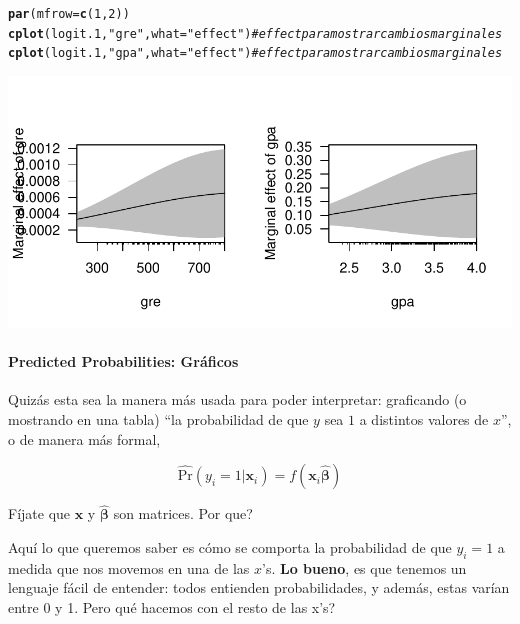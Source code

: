 \documentclass[onesided]{article}\usepackage[]{graphicx}\usepackage[]{color}
\makeatletter
\def\maxwidth{ %
  \ifdim\Gin@nat@width>\linewidth
    \linewidth
  \else
    \Gin@nat@width
  \fi
}
\newcommand{\hlnum}[1]{\textcolor[rgb]{0.686,0.059,0.569}{#1}}%
\newcommand{\hlstr}[1]{\textcolor[rgb]{0.192,0.494,0.8}{#1}}%
\newcommand{\hlcom}[1]{\textcolor[rgb]{0.678,0.584,0.686}{\textit{#1}}}%
\newcommand{\hlstd}[1]{\textcolor[rgb]{0.345,0.345,0.345}{#1}}%
\newcommand{\hlkwc}[1]{\textcolor[rgb]{0.333,0.667,0.333}{#1}}%
\newcommand{\hlkwd}[1]{\textcolor[rgb]{0.737,0.353,0.396}{\textbf{#1}}}%
\newenvironment{kframe}{%
 \def\at@end@of@kframe{}%
 \ifinner\ifhmode%
  \def\at@end@of@kframe{\end{minipage}}%
  \begin{minipage}{\columnwidth}%
 \fi\fi%
 \def\FrameCommand##1{\hskip\@totalleftmargin \hskip-\fboxsep
 \colorbox{shadecolor}{##1}\hskip-\fboxsep
     \hskip-\linewidth \hskip-\@totalleftmargin \hskip\columnwidth}%
 \MakeFramed {\advance\hsize-\width
   \@totalleftmargin\z@ \linewidth\hsize
   \@setminipage}}%
 {\par\unskip\endMakeFramed%
 \at@end@of@kframe}
\newenvironment{knitrout}{}{} %
\makeatother
\begin{document}
\begin{knitrout}
\color{fgcolor}\begin{kframe}
\begin{alltt}
\hlkwd{par}\hlstd{(}\hlkwc{mfrow}\hlstd{=}\hlkwd{c}\hlstd{(}\hlnum{1}\hlstd{,}\hlnum{2}\hlstd{))}
\hlkwd{cplot}\hlstd{(logit.1,} \hlstr{"gre"}\hlstd{,} \hlkwc{what} \hlstd{=} \hlstr{"effect"}\hlstd{)} \hlcom{# effect para mostrar cambios marginales}
\hlkwd{cplot}\hlstd{(logit.1,} \hlstr{"gpa"}\hlstd{,} \hlkwc{what} \hlstd{=} \hlstr{"effect"}\hlstd{)} \hlcom{# effect para mostrar cambios marginales}
\end{alltt}
\end{kframe}

{\centering \includegraphics[width=\maxwidth]{figure/sc3-1} 

}



\end{knitrout}


\paragraph{Predicted Probabilities: Gr\'aficos}

Quiz\'as esta sea la manera m\'as usada para poder interpretar: graficando (o mostrando en una tabla) ``la probabilidad de que $y$ sea $1$ a distintos valores de $x$'', o de manera m\'as formal, 

\begin{equation}%
\hat{\text{Pr}}(y_{i}=1|{\mathbf x}_{i}) = f({\mathbf x}_{i}{\boldsymbol{\hat\beta}})
\end{equation}

F\'ijate que ${\mathbf x}$ y $\boldsymbol{\hat{\beta}}$ son matrices. {\color{red}Por que?} 

Aqu\'i lo que queremos saber es c\'omo se comporta la probabilidad de que $y_{i}=1$ a medida que nos movemos en una de las $x$'s. {\bf Lo bueno}, es que tenemos un lenguaje f\'acil de entender: todos entienden probabilidades, y adem\'as, estas var\'ian entre 0 y 1. {\color{red}Pero qu\'e hacemos con el resto de las x's?}
\end{document}
